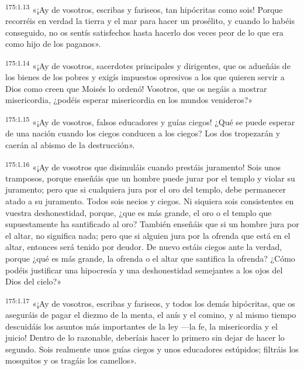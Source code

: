 \par 
\textsuperscript{175:1.13} «¡Ay de vosotros, escribas y fariseos, tan hipócritas como sois! Porque recorréis en verdad la tierra y el mar para hacer un prosélito, y cuando lo habéis conseguido, no os sentís satisfechos hasta hacerlo dos veces peor de lo que era como hijo de los paganos».

\par 
\textsuperscript{175:1.14} «¡Ay de vosotros, sacerdotes principales y dirigentes, que os adueñáis de los bienes de los pobres y exigís impuestos opresivos a los que quieren servir a Dios como creen que Moisés lo ordenó! Vosotros, que os negáis a mostrar misericordia, ¿podéis esperar misericordia en los mundos venideros?»

\par 
\textsuperscript{175:1.15} «¡Ay de vosotros, falsos educadores y guías ciegos! ¿Qué se puede esperar de una nación cuando los ciegos conducen a los ciegos? Los dos tropezarán y caerán al abismo de la destrucción».

\par 
\textsuperscript{175:1.16} «¡Ay de vosotros que disimuláis cuando prestáis juramento! Sois unos tramposos, porque enseñáis que un hombre puede jurar por el templo y violar su juramento; pero que si cualquiera jura por el oro del templo, debe permanecer atado a su juramento. Todos sois necios y ciegos. Ni siquiera sois consistentes en vuestra deshonestidad, porque, ¿que es más grande, el oro o el templo que supuestamente ha santificado al oro? También enseñáis que si un hombre jura por el altar, no significa nada; pero que si alguien jura por la ofrenda que está en el altar, entonces será tenido por deudor. De nuevo estáis ciegos ante la verdad, porque ¿qué es más grande, la ofrenda o el altar que santifica la ofrenda? ¿Cómo podéis justificar una hipocresía y una deshonestidad semejantes a los ojos del Dios del cielo?»

\par 
\textsuperscript{175:1.17} «¡Ay de vosotros, escribas y fariseos, y todos los demás hipócritas, que os aseguráis de pagar el diezmo de la menta, el anís y el comino, y al mismo tiempo descuidáis los asuntos más importantes de la ley ---la fe, la misericordia y el juicio! Dentro de lo razonable, deberíais hacer lo primero sin dejar de hacer lo segundo. Sois realmente unos guías ciegos y unos educadores estúpidos; filtráis los mosquitos y os tragáis los camellos».

